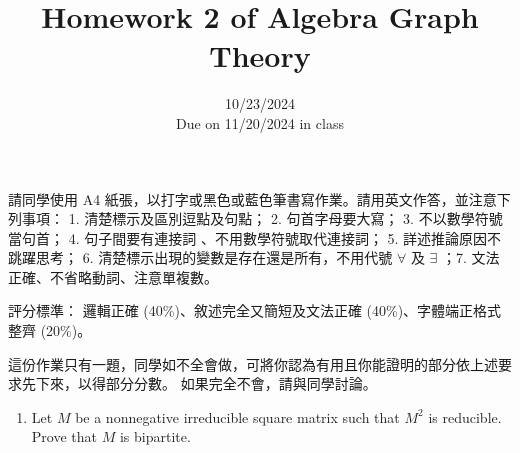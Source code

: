 \documentclass[12pt]{article}
\title{Homework 2 of Algebra Graph Theory}
\author{10/23/2024\\ Due on 11/20/2024 in class }
\date{}
\begin{document}
\maketitle
\bigskip


\noindent 請同學使用  A4 紙張，以打字或黑色或藍色筆書寫作業。請用英文作答，並注意下列事項：
1. 清楚標示及區別逗點及句點； 2. 句首字母要大寫； 3. 不以數學符號當句首； 4. 句子間要有連接詞 、不用數學符號取代連接詞；
5. 詳述推論原因不跳躍思考； 6. 清楚標示出現的變數是存在還是所有，不用代號 $\forall$ 及 $\exists$ ；7. 文法正確、不省略動詞、注意單複數。
\bigskip

\noindent 評分標準： 邏輯正確 (40\%)、敘述完全又簡短及文法正確 (40\%)、字體端正格式整齊 (20\%)。
\bigskip


這份作業只有一題，同學如不全會做，可將你認為有用且你能證明的部分依上述要求先下來，以得部分分數。
如果完全不會，請與同學討論。


\begin{enumerate}
\item Let $M$ be a nonnegative irreducible square matrix  such that $M^2$ is reducible.   Prove that $M$ is bipartite.
    
    
   
\end{enumerate}
\end{document}
